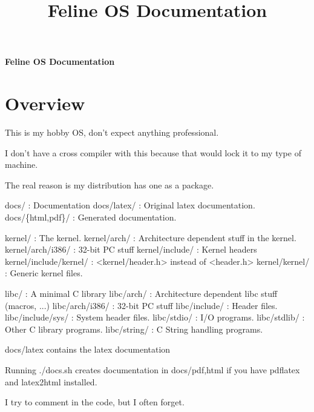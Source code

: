 \documentclass[12pt]{article}
\title{Feline OS Documentation}
\begin{document}
\begin{center}
\fontsize{25}{35}
\selectfont
\textbf{Feline OS Documentation}
\end{center}

\section{Overview}
\begin{list}{}{}
\item This is my hobby OS, don't expect anything professional.
\item I don't have a cross compiler with this because that would lock it to my type of machine.
\begin{tiny} The real reason is my distribution has one as a package.\end{tiny}

\begin{list}{}{\begin{bf}Structure\end{bf}}
\item docs/ : Documentation
\subitem docs/latex/ : Original latex documentation.
\subitem docs/\{html,pdf\}/ : Generated documentation.
\item kernel/ : The kernel.
\subitem kernel/arch/ : Architecture dependent stuff in the kernel.
\subsubitem kernel/arch/i386/ : 32-bit PC stuff
\subitem kernel/include/ : Kernel headers
\subsubitem kernel/include/kernel/ : <kernel/header.h> instead of <header.h>
\subitem kernel/kernel/ : Generic kernel files.
\item libc/ : A minimal C library
\subitem libc/arch/ : Architecture dependent libc stuff (macros, ...)
\subsubitem libc/arch/i386/ : 32-bit PC stuff
\subitem libc/include/ : Header files.
\subsubitem libc/include/sys/ : System header files.
\subitem libc/stdio/ : I/O programs.
\subitem libc/stdlib/ : Other C library programs.
\subitem libc/string/ : C String handling programs.
\end{list}

\begin{list}{}{\begin{bf}Documentation\end{bf}}
\item docs/latex contains the latex documentation
\item Running ./docs.sh creates documentation in docs/{pdf,html} if you have pdflatex and latex2html installed.
\item I try to comment in the code, but I often forget.
\end{list}


\end{list}
\end{document}
